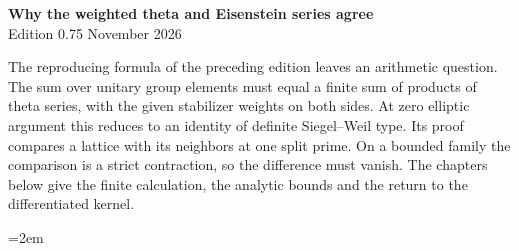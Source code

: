 \begin{center}
{\Large\bfseries Why the weighted theta and Eisenstein series agree}\\[4pt]
Edition 0.75  November 2026
\end{center}

The reproducing formula of the preceding edition leaves an arithmetic
question. The sum over unitary group elements must equal a finite sum
of products of theta series, with the given stabilizer weights on
both sides. At zero elliptic argument this reduces to an identity
of definite Siegel--Weil type. Its proof compares a lattice with its
neighbors at one split prime. On a bounded family the comparison is a
strict contraction, so the difference must vanish. The chapters below
give the finite calculation, the analytic bounds and the return to
the differentiated kernel.

\begingroup\emergencystretch=2em









\endgroup
